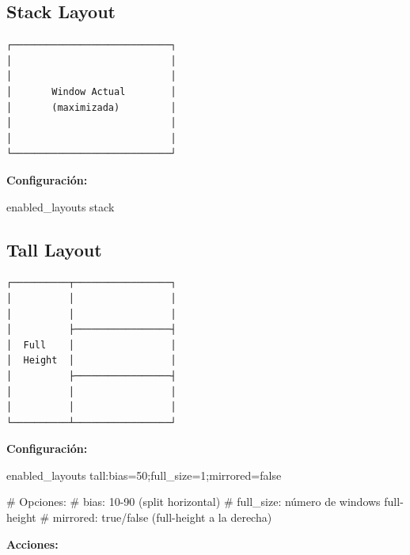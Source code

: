 \documentclass[
  doc,
  floatsintext,
  longtable,
  a4paper,
  nolmodern,
  notxfonts,
  notimes,
  12pt,
  colorlinks=true,linkcolor=blue,citecolor=blue,urlcolor=blue]{apa7}
\newenvironment{Shaded}{\begin{snugshade}}{\end{snugshade}}
\newcommand{\CommentTok}[1]{\textcolor[rgb]{0.37,0.37,0.37}{#1}}
\newcommand{\ConstantTok}[1]{\textcolor[rgb]{0.56,0.35,0.01}{#1}}
\newcommand{\DataTypeTok}[1]{\textcolor[rgb]{0.68,0.00,0.00}{#1}}
\newcommand{\DecValTok}[1]{\textcolor[rgb]{0.68,0.00,0.00}{#1}}
\newcommand{\ErrorTok}[1]{\textcolor[rgb]{0.68,0.00,0.00}{#1}}
\newcommand{\OperatorTok}[1]{\textcolor[rgb]{0.37,0.37,0.37}{#1}}
\begin{document}
\subsection{Stack Layout}\label{stack-layout}

\begin{verbatim}
┌────────────────────────────┐
│                            │
│                            │
│       Window Actual        │
│       (maximizada)         │
│                            │
│                            │
└────────────────────────────┘
\end{verbatim}

\textbf{Configuración:}

\begin{Shaded}
\begin{Highlighting}[]
\DataTypeTok{enabled\_layouts} \DataTypeTok{stack}
\end{Highlighting}
\end{Shaded}

\subsection{Tall Layout}\label{tall-layout}

\begin{verbatim}
┌──────────┬─────────────────┐
│          │                 │
│          │                 │
│          ├─────────────────┤
│  Full    │                 │
│  Height  │                 │
│          ├─────────────────┤
│          │                 │
│          │                 │
└──────────┴─────────────────┘
\end{verbatim}

\textbf{Configuración:}

\begin{Shaded}
\begin{Highlighting}[]
\DataTypeTok{enabled\_layouts} \DataTypeTok{tall}\ErrorTok{:}\DataTypeTok{bias}\OperatorTok{=}\DecValTok{50}\ErrorTok{;}\DataTypeTok{full\_size}\OperatorTok{=}\DecValTok{1}\ErrorTok{;}\DataTypeTok{mirrored}\OperatorTok{=}\ConstantTok{false}

\CommentTok{\# Opciones:}
\CommentTok{\# bias: 10{-}90 (split horizontal)}
\CommentTok{\# full\_size: número de windows full{-}height}
\CommentTok{\# mirrored: true/false (full{-}height a la derecha)}
\end{Highlighting}
\end{Shaded}

\textbf{Acciones:}
\end{document}
